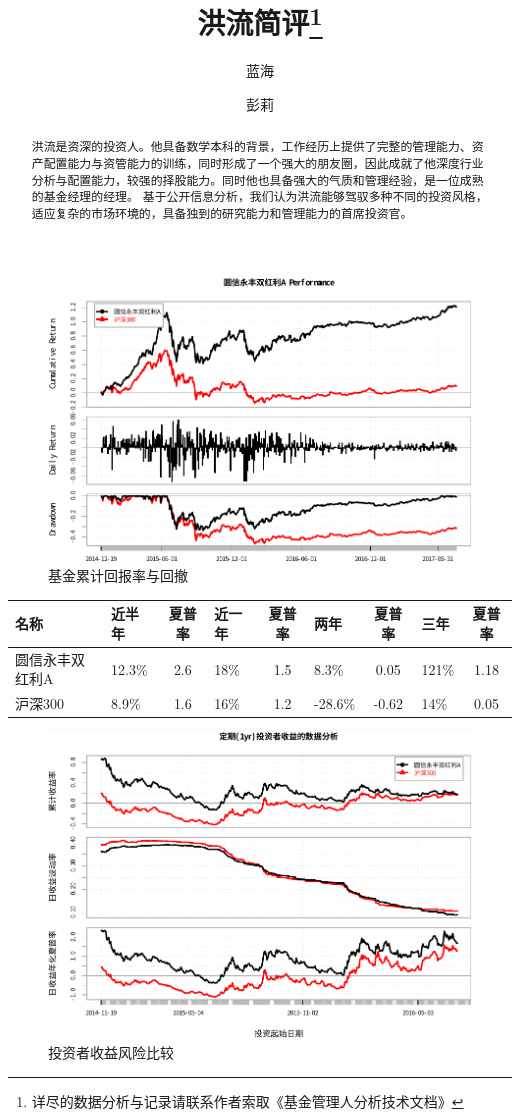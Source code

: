 \documentclass[journal=jacsat,manuscript=article]{achemso}
\author{蓝海}
\author{彭莉}
\title[洪流]{洪流简评\footnote{详尽的数据分析与记录请联系作者索取《基金管理人分析技术文档》}}
\begin{document}
\begin{abstract}
洪流是资深的投资人。他具备数学本科的背景，工作经历上提供了完整的管理能力、资产配置能力与资管能力的训练，同时形成了一个强大的朋友圈，因此成就了他深度行业分析与配置能力，较强的择股能力。同时他也具备强大的气质和管理经验，是一位成熟的基金经理的经理。
基于公开信息分析，我们认为洪流能够驾驭多种不同的投资风格，适应复杂的市场环境的，具备独到的研究能力和管理能力的首席投资官。
\end{abstract}
\begin{figure}[htbp]
\centering
\includegraphics{hl-review_files/figure-latex/unnamed-chunk-2-1.pdf}
\caption{基金累计回报率与回撤}
\end{figure}

\begin{longtable}[]{@{}llclclclc@{}}
\toprule
名称 & 近半年 & 夏普率 & 近一年 & 夏普率 & 两年 & 夏普率 & 三年 &
夏普率\tabularnewline
\midrule
\endhead
圆信永丰双红利A & 12.3\% & 2.6 & 18\% & 1.5 & 8.3\% & 0.05 & 121\% &
1.18\tabularnewline
沪深300 & 8.9\% & 1.6 & 16\% & 1.2 & -28.6\% & -0.62 & 14\% &
0.05\tabularnewline
\bottomrule
\end{longtable}

\begin{figure}[htbp]
\centering
\includegraphics{hl-review_files/figure-latex/unnamed-chunk-3-1.pdf}
\caption{投资者收益风险比较}
\end{figure}
\end{document}
